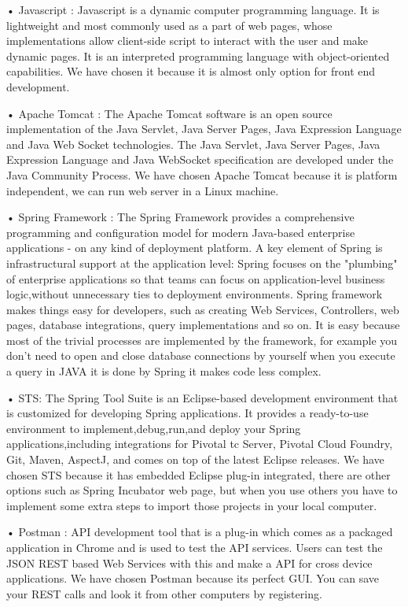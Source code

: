 • Javascript : Javascript is a dynamic computer programming language. It is lightweight and most commonly used as a part of web pages, whose implementations allow client-side script to interact with the user and make dynamic pages. It is an interpreted programming language with object-oriented capabilities. \cite{JavascriptTanim}
 We have chosen it because it is almost only option for front end development. 

• Apache Tomcat : The Apache Tomcat software is an open source implementation of the Java Servlet, Java Server Pages, Java Expression Language and Java Web Socket technologies. The Java Servlet, Java Server Pages, Java Expression Language and Java WebSocket specification are developed under the Java Community Process. \cite{TomcatTanim}
 We have chosen Apache Tomcat because it is platform independent, we can run web server in a Linux machine. 

• Spring Framework :  The Spring Framework provides a comprehensive programming and configuration model for modern Java-based enterprise applications - on any kind of deployment platform.
\cite{SpringFrameTanim}
 A key element of Spring is infrastructural support at the application level: Spring focuses on the "plumbing" of enterprise applications so that teams can focus on application-level business logic,without unnecessary ties to deployment environments. Spring framework makes things easy for developers, such as creating Web Services, Controllers, web pages, database integrations, query implementations and so on. It is easy because most of the trivial processes are implemented by the framework, for example you don't need to open and close database connections by yourself when you execute a query in JAVA it is done by Spring it makes code less complex.

• STS: The Spring Tool Suite is an Eclipse-based development environment that is customized for developing Spring applications. It provides a ready-to-use environment to implement,debug,run,and deploy your Spring applications,including integrations for Pivotal tc Server, Pivotal Cloud Foundry, Git, Maven, AspectJ, and comes on top of the latest Eclipse releases. 
\cite{STSTanim}
We have chosen STS because it has embedded Eclipse plug-in integrated, there are other options such as Spring Incubator web page, but when you use others you have to implement some extra steps to import those projects in your local computer.

• Postman : API development tool that is a plug-in which comes as a packaged application in Chrome and is used to test the API services. Users can test the JSON REST based Web Services with this and make a API for cross device applications. 
\cite{PostmanTanim}
We have chosen Postman because its perfect GUI. You can save your REST calls and look it from other computers by registering. 

